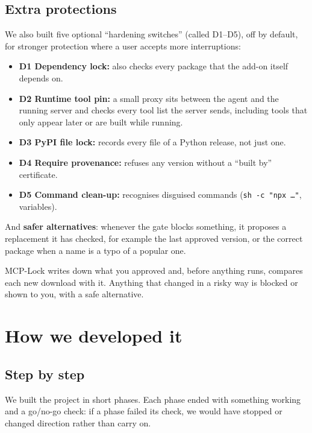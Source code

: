 \documentclass[11pt,a4paper]{article}
\newcommand{\code}[1]{\texttt{#1}}
\begin{document}
\subsection{Extra protections}
We also built five optional ``hardening switches'' (called D1--D5), off by default, for stronger protection where a
user accepts more interruptions:
\begin{itemize}
  \item \textbf{D1 Dependency lock:} also checks every package that the add-on itself depends on.
  \item \textbf{D2 Runtime tool pin:} a small proxy sits between the agent and the running server and checks
        every tool list the server sends, including tools that only appear later or are built while running.
  \item \textbf{D3 PyPI file lock:} records every file of a Python release, not just one.
  \item \textbf{D4 Require provenance:} refuses any version without a ``built by'' certificate.
  \item \textbf{D5 Command clean-up:} recognises disguised commands (\code{sh -c "npx \ldots"}, variables).
\end{itemize}
And \textbf{safer alternatives}: whenever the gate blocks something, it proposes a replacement it has checked, for
example the last approved version, or the correct package when a name is a typo of a popular one.

\begin{simple}
MCP-Lock writes down what you approved and, before anything runs, compares each new download with it. Anything
that changed in a risky way is blocked or shown to you, with a safe alternative.
\end{simple}

\section{How we developed it}

\subsection{Step by step}
We built the project in short phases. Each phase ended with something working and a go/no-go check: if a phase
failed its check, we would have stopped or changed direction rather than carry on.
\end{document}
